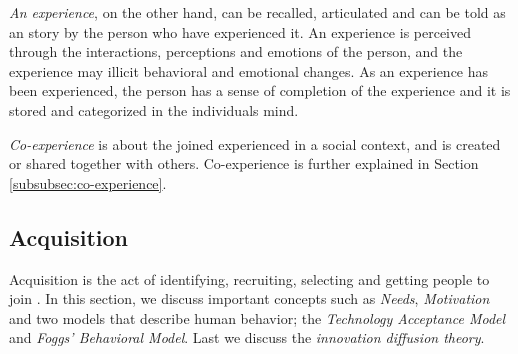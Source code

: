 \textit{An experience}, on the other hand, can be recalled, articulated and can be told as an story by the person who have experienced it. An experience is perceived through the interactions, perceptions and emotions of the person, and the experience may illicit behavioral and emotional changes. As an experience has been experienced, the person has a sense of completion of the experience and it is stored and categorized in the individuals mind.

\textit{Co-experience} is about the joined experienced in a social context, and is created or shared together with others. Co-experience is further explained in Section \ref{subsubsec:co-experience}.

\subsection{Acquisition}
Acquisition is the act of identifying, recruiting, selecting and getting people to join \cite{Bradt2009}. In this section, we discuss important concepts such as \textit{Needs}, \textit{Motivation} and two models that describe human behavior; the \textit{Technology Acceptance Model} and \textit{Foggs' Behavioral Model}. Last we discuss the \textit{innovation diffusion theory}.

